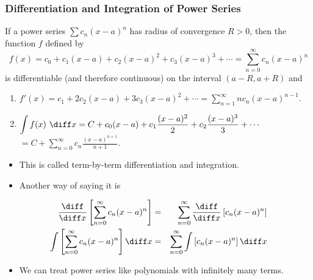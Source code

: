 \begin{frame}
\frametitle{Differentiation and Integration of Power Series}
\begin{theorem}
If a power series $\sum c_n (x-a)^n$ has radius of convergence $R >0$, then the function $f$ defined by
\abovedisplayskip=0pt
\belowdisplayskip=0pt
\[
f(x) = c_0 + c_1(x-a) + c_2(x-a)^2 + c_3(x-a)^3 +\cdots  = \sum_{n=0}^\infty c_n(x-a)^n%
\]
is differentiable (and therefore continuous) on the interval $(a-R, a+R)$ and
\begin{enumerate}
\item  $\displaystyle f'(x) = c_1 + 2c_2(x-a) + 3c_3(x-a)^2 + \cdots = \sum_{n=1}^\infty nc_n(x-a)^{n-1}$.
\item  $\displaystyle \int f(x) \ \diff x  = C + c_0(x-a) + c_1\frac{(x-a)^2}{2} + c_2\frac{(x-a)^3}{3} + \cdots $ $= C + \sum_{n=0}^\infty c_n\frac{(x-a)^{n+1}}{n+1}$.
\end{enumerate}
\end{theorem}
\end{frame}


\begin{frame}
\begin{itemize}
\item  This is called term-by-term differentiation and integration.
\item  Another way of saying it is
\end{itemize}
\begin{eqnarray*}
\frac{\diff}{\diff x} \left[ \sum_{n=0}^\infty c_n (x-a)^n\right] & = & \sum_{n=0}^\infty \frac{\diff}{\diff x} \left[ c_n (x-a)^n\right]\\
\int \left[ \sum_{n=0}^\infty c_n (x-a)^n\right] \diff x & = & \sum_{n=0}^\infty \int \left[ c_n (x-a)^n\right] \diff x
\end{eqnarray*}
\begin{itemize}
\item  We can treat power series like polynomials with infinitely many terms.
\end{itemize}
\end{frame}
